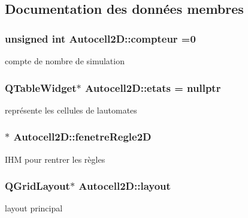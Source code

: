 \subsection{Documentation des données membres}
\subsubsection[{\texorpdfstring{compteur}{compteur}}]{\setlength{\rightskip}{0pt plus 5cm}unsigned int Autocell2\+D\+::compteur =0\hspace{0.3cm}{\ttfamily [protected]}}\hypertarget{class_autocell2_d_a8d5918116d265492d58a7cdddd7de49d}{}\label{class_autocell2_d_a8d5918116d265492d58a7cdddd7de49d}
compte de nombre de simulation 
\subsubsection[{\texorpdfstring{etats}{etats}}]{\setlength{\rightskip}{0pt plus 5cm}Q\+Table\+Widget$\ast$ Autocell2\+D\+::etats = nullptr\hspace{0.3cm}{\ttfamily [protected]}}\hypertarget{class_autocell2_d_a3a7359db79b875b93bcf89ab8377cf7e}{}\label{class_autocell2_d_a3a7359db79b875b93bcf89ab8377cf7e}
représente les cellules de l\textquotesingle{}automates 
\subsubsection[{\texorpdfstring{fenetre\+Regle2D}{fenetreRegle2D}}]{$\ast$ Autocell2\+D\+::fenetre\+Regle2D\hspace{0.3cm}{\ttfamily [protected]}}\hypertarget{class_autocell2_d_a46226226228ceb3dd4c5cd4a04867a85}{}\label{class_autocell2_d_a46226226228ceb3dd4c5cd4a04867a85}
I\+HM pour rentrer les règles 
\subsubsection[{\texorpdfstring{layout}{layout}}]{\setlength{\rightskip}{0pt plus 5cm}Q\+Grid\+Layout$\ast$ Autocell2\+D\+::layout\hspace{0.3cm}{\ttfamily [protected]}}\hypertarget{class_autocell2_d_ae935ff1610be1b1375f62b6877c35afb}{}\label{class_autocell2_d_ae935ff1610be1b1375f62b6877c35afb}
layout principal 
